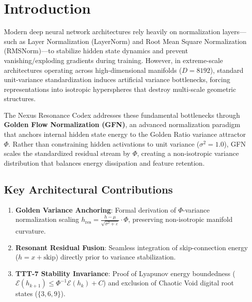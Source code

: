 \section{Introduction}
Modern deep neural network architectures rely heavily on normalization layers—such as Layer Normalization (LayerNorm) and Root Mean Square Normalization (RMSNorm)—to stabilize hidden state dynamics and prevent vanishing/exploding gradients during training. However, in extreme-scale architectures operating across high-dimensional manifolds ($D=8192$), standard unit-variance standardization induces artificial variance bottlenecks, forcing representations into isotropic hyperspheres that destroy multi-scale geometric structures.

The Nexus Resonance Codex addresses these fundamental bottlenecks through \textbf{Golden Flow Normalization (GFN)}, an advanced normalization paradigm that anchors internal hidden state energy to the Golden Ratio variance attractor $\Phi$. Rather than constraining hidden activations to unit variance ($\sigma^2 = 1.0$), GFN scales the standardized residual stream by $\Phi$, creating a non-isotropic variance distribution that balances energy dissipation and feature retention.

\subsection{Key Architectural Contributions}
\begin{enumerate}[label=\textbf{\arabic*.}]
    \item \textbf{Golden Variance Anchoring}: Formal derivation of $\Phi$-variance normalization scaling $h_{\text{res}} = \frac{h - \mu}{\sqrt{\sigma^2 + \varepsilon}} \cdot \Phi$, preserving non-isotropic manifold curvature.
    \item \textbf{Resonant Residual Fusion}: Seamless integration of skip-connection energy ($h = x + \text{skip}$) directly prior to variance stabilization.
    \item \textbf{TTT-7 Stability Invariance}: Proof of Lyapunov energy boundedness ($\mathcal{E}(h_{k+1}) \le \Phi^{-1} \mathcal{E}(h_k) + C$) and exclusion of Chaotic Void digital root states ($\{3, 6, 9\}$).
\end{enumerate}